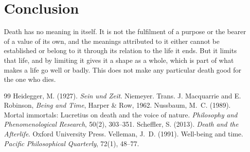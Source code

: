 \documentclass{situationist-preprint}
\begin{document}
\section{Conclusion}

Death has no meaning in itself. It is not the fulfilment of a purpose or the bearer of a value of its own, and the meanings attributed to it either cannot be established or belong to it through its relation to the life it ends. But it limits that life, and by limiting it gives it a shape as a whole, which is part of what makes a life go well or badly. This does not make any particular death good for the one who dies.

\begin{thebibliography}{99}\small
{} Heidegger, M. (1927). \emph{Sein und Zeit}. Niemeyer. Trans. J. Macquarrie and E. Robinson, \emph{Being and Time}, Harper \& Row, 1962.
 Nussbaum, M.~C. (1989). Mortal immortals: Lucretius on death and the voice of nature. \emph{Philosophy and Phenomenological Research}, 50(2), 303--351.
 Scheffler, S. (2013). \emph{Death and the Afterlife}. Oxford University Press.
 Velleman, J.~D. (1991). Well-being and time. \emph{Pacific Philosophical Quarterly}, 72(1), 48--77.
\end{thebibliography}
\end{document}
